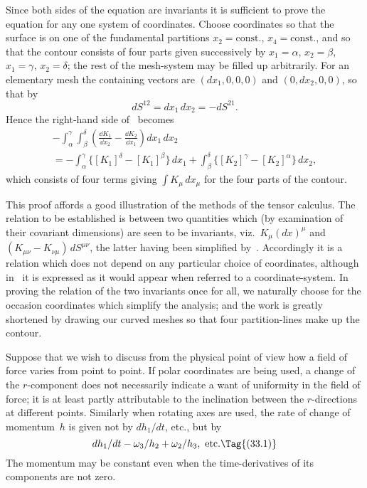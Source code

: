 \documentclass[12pt]{book}
\begin{document}
Since both sides of the equation are invariants it is sufficient to prove the
equation for any one system of coordinates. Choose coordinates so that the
surface is on one of the fundamental partitions $x_{2} = \text{const.}$, $x_{4} = \text{const.}$, and so
that the contour consists of four parts given successively by $x_{1} = \alpha$, $x_{2} = \beta$,
$x_{1} = \gamma$, $x_{2} = \delta$; the rest of the mesh-system may be filled up arbitrarily. For
an elementary mesh the containing vectors are $(dx_{1}, 0, 0, 0)$ and $(0, dx_{2} , 0, 0)$,
so that by~
\[
dS^{12} = dx_{1}\, dx_{2} = -dS^{21}.
\]
Hence the right-hand side of~ becomes
\begin{multline*}
  -\int_{\alpha}^{\gamma} \int_{\beta}^{\delta} \left(\frac{\dd K_{1}}{\dd x_{2}} - \frac{\dd K_{2}}{\dd x_{1}}\right) dx_{1}\, dx_{2} \\
  = -\int_{\alpha}^{\gamma} \bigl\{[K_{1}]^{\delta} - [K_{1}]^{\beta}\bigr\}\, dx_{1}
   + \int_{\beta}^{\delta} \bigl\{[K_{2}]^{\gamma} - [K_{2}]^{\alpha}\bigr\}\, dx_{2},
\end{multline*}
which consists of four terms giving $\int K_{\mu}\, dx_{\mu}$ for the four parts of the contour.

This proof affords a good illustration of the methods of the tensor calculus.
The relation to be established is between two quantities which (by examination
of their covariant dimensions) are seen to be invariants, viz.\ $K_{\mu} (dx)^{\mu}$ and
%
%
$(K_{\mu\nu} - K_{\nu\mu})\, dS^{\mu\nu}$, the latter having been simplified by~. Accordingly it
is a relation which does not depend on any particular choice of coordinates,
although in~ it is expressed as it would appear when referred to a
coordinate-system. In proving the relation of the two invariants once for all,
we naturally choose for the occasion coordinates which simplify the analysis;
and the work is greatly shortened by drawing our curved meshes so that four
partition-lines make up the contour.


Suppose that we wish to discuss from the physical point of view how a
field of force varies from point to point. If polar coordinates are being used,
a change of the $r$-component does not necessarily indicate a want of uniformity
in the field of force; it is at least partly attributable to the inclination between
the $r$-directions at different points. Similarly when rotating axes are used,
the rate of change of momentum~$h$ is given not by $dh_{1}/dt$, etc., but by
\[
dh_{1}/dt - \omega_{3}/h_{2} + \omega_{2}/h_{3}, \text{ etc.}
\Tag{(33.1)}
\]
The momentum may be constant even when the time-derivatives of its components
are not zero.
\end{document}
